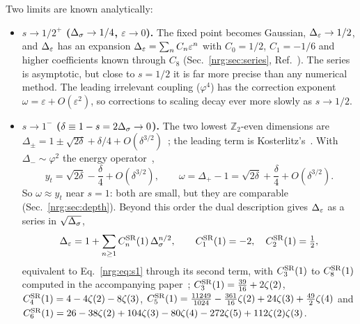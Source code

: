 Two limits are known analytically:
\begin{itemize}
\item \textbf{$s\to1/2^+$ ($\Delta_\sigma\to1/4$, $\varepsilon\to0$).} The fixed point becomes Gaussian, $\Delta_\varepsilon\to1/2$, and $\Delta_\varepsilon$ has an
  expansion $\Delta_\varepsilon=\sum_nC_n\varepsilon^n$ with $C_0=1/2$, $C_1=-1/6$ and higher coefficients known through $C_8$ (Sec.~\ref{nrg:sec:series},
  Ref.~\cite{nrg:Paper}). The series is asymptotic, but close to $s=1/2$ it is far more precise than any numerical method. The leading
  irrelevant coupling ($\varphi^4$) has the correction exponent $\omega=\varepsilon+O(\varepsilon^2)$, so corrections to scaling
  decay ever more slowly as $s\to1/2$.
\item \textbf{$s\to1^-$ ($\delta\equiv1-s=2\Delta_\sigma\to0$).} The two lowest $\mathbb Z_2$-even dimensions are
  $\Delta_\pm=1\pm\sqrt{2\delta}+\delta/4+O(\delta^{3/2})$~\cite{nrg:BLMV25,nrg:BLMV26}; the leading term is Kosterlitz's~\cite{nrg:Kosterlitz1976}.
  With $\Delta_-\sim\varphi^2$ the energy operator~\cite{nrg:BLMV25},
  \begin{equation}
  y_t=\sqrt{2\delta}-\frac\delta4+O(\delta^{3/2}),\qquad \omega=\Delta_+-1=\sqrt{2\delta}+\frac\delta4+O(\delta^{3/2}).\label{nrg:eq:s1}
  \end{equation}
  So $\omega\approx y_t$ near $s=1$: both are small, but they are comparable (Sec.~\ref{nrg:sec:depth}). Beyond this order the dual
  description gives $\Delta_\varepsilon$ as a series in $\sqrt{\Delta_\sigma}$,
  \begin{equation}
  \Delta_\varepsilon=1+\sum_{n\ge1}C^{\rm SR}_n(1)\,\Delta_\sigma^{n/2},\qquad C^{\rm SR}_1(1)=-2,\quad C^{\rm SR}_2(1)=\tfrac12,\label{nrg:eq:dual}
  \end{equation}
  equivalent to Eq.~\eqref{nrg:eq:s1} through its second term, with $C^{\rm SR}_3(1)$ to $C^{\rm SR}_8(1)$ computed in the accompanying
  paper~\cite{nrg:Paper}; $C^{\rm SR}_3(1)=\frac{39}{16}+2\zeta(2)$, $C^{\rm SR}_4(1)=4-4\zeta(2)-8\zeta(3)$,
  $C^{\rm SR}_5(1)=\frac{11249}{1024}-\frac{361}{16}\zeta(2)+24\zeta(3)+\frac{49}{2}\zeta(4)$ and
  $C^{\rm SR}_6(1)=26-38\zeta(2)+104\zeta(3)-80\zeta(4)-272\zeta(5)+112\zeta(2)\zeta(3)$.
\end{itemize}

